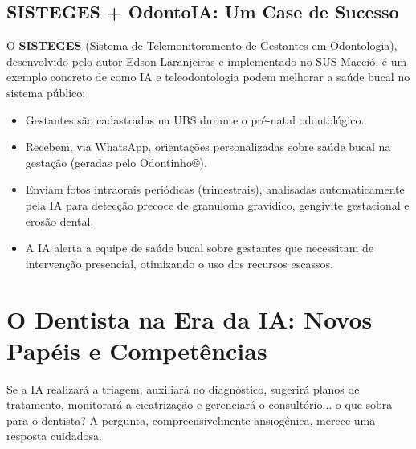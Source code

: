 \subsection{SISTEGES + OdontoIA: Um Case de Sucesso}

O \textbf{SISTEGES} (Sistema de Telemonitoramento de Gestantes em Odontologia),
desenvolvido pelo autor Edson Laranjeiras e implementado no SUS Maceió, é um
exemplo concreto de como IA e teleodontologia podem melhorar a saúde bucal no
sistema público:

\begin{itemize}
  \item Gestantes são cadastradas na UBS durante o pré-natal odontológico.
  \item Recebem, via WhatsApp, orientações personalizadas sobre saúde bucal na
    gestação (geradas pelo Odontinho®).
  \item Enviam fotos intraorais periódicas (trimestrais), analisadas
    automaticamente pela IA para detecção precoce de granuloma gravídico,
    gengivite gestacional e erosão dental.
  \item A IA alerta a equipe de saúde bucal sobre gestantes que necessitam de
    intervenção presencial, otimizando o uso dos recursos escassos.
\end{itemize}


 

\section{O Dentista na Era da IA: Novos Papéis e Competências}
\label{sec:dentista-era-ia}

\nivelquatro

Se a IA realizará a triagem, auxiliará no diagnóstico, sugerirá planos de
tratamento, monitorará a cicatrização e gerenciará o consultório... o que sobra
para o dentista? A pergunta, compreensivelmente ansiogênica, merece uma resposta
cuidadosa.


